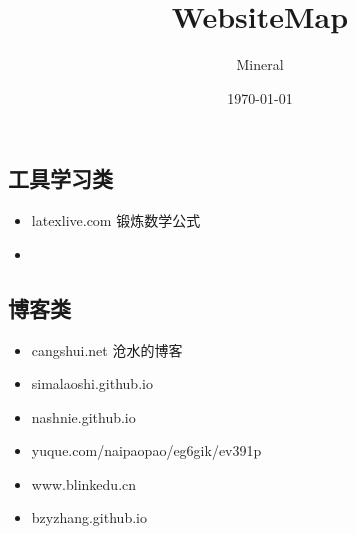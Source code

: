 \documentclass[utf8]{ctexart}
\author{Mineral}
\title{WebsiteMap}
\date {\today}
\begin{document}
		\maketitle
		\subsection{工具学习类}
		\begin{itemize}
				\item latexlive.com 锻炼数学公式
				\item 	
		\end{itemize}
		\subsection{博客类}
		\begin{itemize}
				\item cangshui.net 沧水的博客
				\item simalaoshi.github.io
				\item nashnie.github.io
				\item yuque.com/naipaopao/eg6gik/ev391p
				\item www.blinkedu.cn
				\item bzyzhang.github.io	
		\end{itemize}
\end{document}
